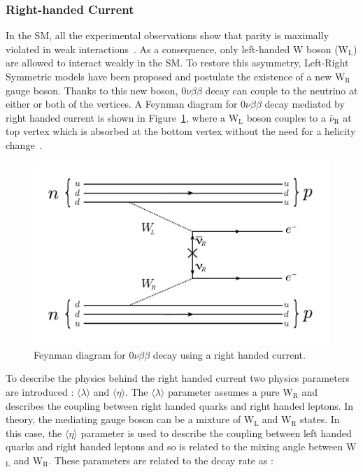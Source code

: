 \documentclass[main.tex]{subfiles}
\begin{document}
\subsubsection{Right-handed Current}


\NI In the SM, all the experimental observations show that parity is maximally violated in weak interactions~\cite{Wu,NeutrinoHelicity}. As a consequence,  only left-handed W boson (W$_\text{L}$) are allowed to interact weakly in the SM. To restore this asymmetry, Left-Right Symmetric models have been proposed and postulate the existence of a new W$_\text{R}$ gauge boson. Thanks to this new boson, 0$\nu\beta\beta$ decay can couple to the neutrino at either or both of the vertices. A Feynman diagram for 0$\nu\beta\beta$ decay mediated by right handed current is shown in Figure~\ref{OnbbFeynmanDiagramRHC}, where a W$_\text{L}$ boson couples to a $\bar{\nu}_\text{R}$ at top vertex which is absorbed at the bottom vertex without the need for a helicity change~\cite{DBDRightHandedCurrent}.


\begin{figure}[h!]
\begin{center}
\includegraphics[scale=0.45]{pictures/Chap2/0nubbFeynmanDiagram_RHC.pdf}
\caption{Feynman diagram for 0$\nu\beta\beta$ decay using a right handed current.}
\label{OnbbFeynmanDiagramRHC}
\end{center}
\end{figure}


\NI To describe the physics behind the right handed current two physics parameters are introduced : $\langle \lambda \rangle$ and $\langle \eta \rangle$. The $\langle \lambda \rangle$ parameter assumes a pure W$_\text{R}$ and describes the coupling between right handed quarks and right handed leptons. In theory, the mediating gauge boson can be a mixture of W$_\text{L}$ and W$_\text{R}$ states. In this case, the $\langle \eta \rangle$ parameter is used to describe the coupling between left handed quarks and right handed leptons and so is related to the mixing angle between W$_\text{L}$ and W$_\text{R}$. These parameters are related to the decay rate as :
\end{document}
